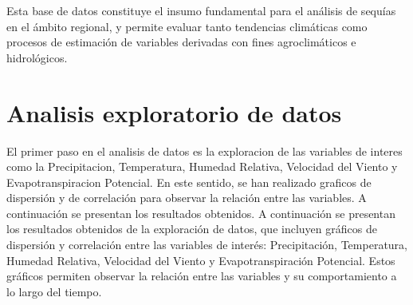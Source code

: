 Esta base de datos constituye el insumo fundamental para el análisis de sequías en el ámbito regional, y permite evaluar tanto tendencias climáticas como procesos de estimación de variables derivadas con fines agroclimáticos e hidrológicos.


\section{Analisis exploratorio de datos}
El primer paso en el analisis de datos es la exploracion de las variables de interes como la Precipitacion, Temperatura, Humedad Relativa, Velocidad del Viento y Evapotranspiracion Potencial. En este sentido, se han realizado graficos de dispersión y de correlación para observar la relación entre las variables. A continuación se presentan los resultados obtenidos.
A continuación se presentan los resultados obtenidos de la exploración de datos, que incluyen gráficos de dispersión y correlación entre las variables de interés: Precipitación, Temperatura, Humedad Relativa, Velocidad del Viento y Evapotranspiración Potencial. Estos gráficos permiten observar la relación entre las variables y su comportamiento a lo largo del tiempo.


